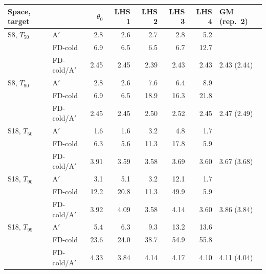 \begin{tabular}{llrrrrrl}\toprule
Space, target & & $\theta_0$ & LHS 1 & LHS 2 & LHS 3 & LHS 4 & GM (rep.~2)\\\midrule
S8, $T_{50}$ & A$'$ & 2.8 & 2.6 & 2.7 & 2.8 & 5.2 & \\
 & FD-cold & 6.9 & 6.5 & 6.5 & 6.7 & 12.7 & \\
 & FD-cold/A$'$ & 2.45 & 2.45 & 2.39 & 2.43 & 2.43 & 2.43 (2.44)\\
\addlinespace
S8, $T_{90}$ & A$'$ & 2.8 & 2.6 & 7.6 & 6.4 & 8.9 & \\
 & FD-cold & 6.9 & 6.5 & 18.9 & 16.3 & 21.8 & \\
 & FD-cold/A$'$ & 2.45 & 2.45 & 2.50 & 2.52 & 2.45 & 2.47 (2.49)\\
\addlinespace
S18, $T_{50}$ & A$'$ & 1.6 & 1.6 & 3.2 & 4.8 & 1.7 & \\
 & FD-cold & 6.3 & 5.6 & 11.3 & 17.8 & 5.9 & \\
 & FD-cold/A$'$ & 3.91 & 3.59 & 3.58 & 3.69 & 3.60 & 3.67 (3.68)\\
\addlinespace
S18, $T_{90}$ & A$'$ & 3.1 & 5.1 & 3.2 & 12.1 & 1.7 & \\
 & FD-cold & 12.2 & 20.8 & 11.3 & 49.9 & 5.9 & \\
 & FD-cold/A$'$ & 3.92 & 4.09 & 3.58 & 4.14 & 3.60 & 3.86 (3.84)\\
\addlinespace
S18, $T_{99}$ & A$'$ & 5.4 & 6.3 & 9.3 & 13.2 & 13.6 & \\
 & FD-cold & 23.6 & 24.0 & 38.7 & 54.9 & 55.8 & \\
 & FD-cold/A$'$ & 4.33 & 3.84 & 4.14 & 4.17 & 4.10 & 4.11 (4.04)\\
\bottomrule\end{tabular}
